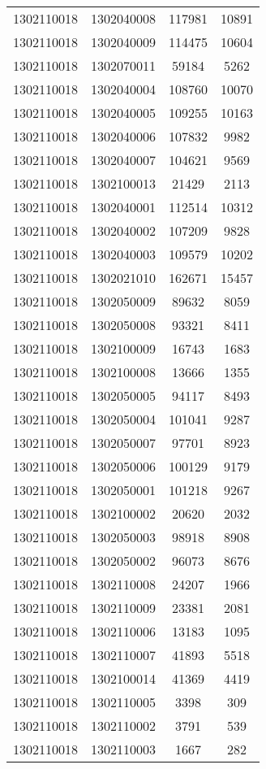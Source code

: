 \begin{longtable}[h]{llcc}
		1302110018 & 1302040008 & 117981 & 10891\\
		1302110018 & 1302040009 & 114475 & 10604\\
		1302110018 & 1302070011 & 59184 & 5262\\
		1302110018 & 1302040004 & 108760 & 10070\\
		1302110018 & 1302040005 & 109255 & 10163\\
		1302110018 & 1302040006 & 107832 & 9982\\
		1302110018 & 1302040007 & 104621 & 9569\\
		1302110018 & 1302100013 & 21429 & 2113\\
		1302110018 & 1302040001 & 112514 & 10312\\
		1302110018 & 1302040002 & 107209 & 9828\\
		1302110018 & 1302040003 & 109579 & 10202\\
		1302110018 & 1302021010 & 162671 & 15457\\
		1302110018 & 1302050009 & 89632 & 8059\\
		1302110018 & 1302050008 & 93321 & 8411\\
		1302110018 & 1302100009 & 16743 & 1683\\
		1302110018 & 1302100008 & 13666 & 1355\\
		1302110018 & 1302050005 & 94117 & 8493\\
		1302110018 & 1302050004 & 101041 & 9287\\
		1302110018 & 1302050007 & 97701 & 8923\\
		1302110018 & 1302050006 & 100129 & 9179\\
		1302110018 & 1302050001 & 101218 & 9267\\
		1302110018 & 1302100002 & 20620 & 2032\\
		1302110018 & 1302050003 & 98918 & 8908\\
		1302110018 & 1302050002 & 96073 & 8676\\
		1302110018 & 1302110008 & 24207 & 1966\\
		1302110018 & 1302110009 & 23381 & 2081\\
		1302110018 & 1302110006 & 13183 & 1095\\
		1302110018 & 1302110007 & 41893 & 5518\\
		1302110018 & 1302100014 & 41369 & 4419\\
		1302110018 & 1302110005 & 3398 & 309\\
		1302110018 & 1302110002 & 3791 & 539\\
		1302110018 & 1302110003 & 1667 & 282\\

\end{longtable}
